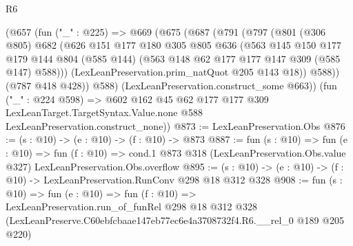 \begin{lexlean}{R6}
\begin{coremodule}
    (@657
      (fun ("_" : @225) =>
      @669
        (@675
          (@687
            (@791
              (@797
                (@801
                  (@306 @805)
                  @682
                  (@626
                    @151
                    @177
                    @180
                    @305
                    @805
                    @636
                    (@563
                      @145
                      @150
                      @177
                      @179
                      @144
                      @804
                      (@585 @144)
                      (@563 @148 @62 @177 @177 @147 @309 (@585 @147) @588)))
                  (LexLeanPreservation.prim_natQuot @205 @143 @18))
                @588))
            (@787 @418 @428))
          @588)
        (LexLeanPreservation.construct_some @663))
      (fun ("_" : @224 @598) =>
      @602
        @162
        @45
        @62
        @177
        @177
        @309
        LexLeanTarget.TargetSyntax.Value.none
        @588
        LexLeanPreservation.construct_none))
@873 := LexLeanPreservation.Obs
@876 := (s : @10) -> (e : @10) -> (f : @10) -> @873
@887 := fun (s : @10) =>
  fun (e : @10) =>
  fun (f : @10) =>
  cond.{1} @873 @318 (LexLeanPreservation.Obs.value @327) LexLeanPreservation.Obs.overflow
@895 := (s : @10) -> (e : @10) -> (f : @10) -> LexLeanPreservation.RunConv @298 @18 @312 @328
@908 := fun (s : @10) =>
  fun (e : @10) =>
  fun (f : @10) =>
  LexLeanPreservation.run_of_funRel
    @298
    @18
    @312
    @328
    (LexLeanPreserve.C60ebfcbaae147eb77ec6e4a3708732f4.R6.__rel_0 @189 @205 @220)
\end{coremodule}
\end{lexlean}

